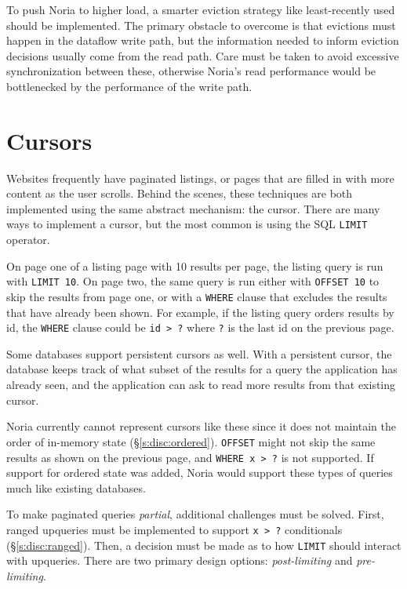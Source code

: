 To push Noria to higher load, a smarter eviction strategy like least-recently
used should be implemented. The primary obstacle to overcome is that evictions
must happen in the dataflow write path, but the information needed to inform
eviction decisions usually come from the read path. Care must be taken to avoid
excessive synchronization between these, otherwise Noria's read performance
would be bottlenecked by the performance of the write path.

\section{Cursors}

Websites frequently have paginated listings, or pages that are filled in with
more content as the user scrolls. Behind the scenes, these techniques are both
implemented using the same abstract mechanism: the cursor. There are many ways to
implement a cursor, but the most common is using the SQL \texttt{LIMIT}
operator.

On page one of a listing page with 10 results per page, the listing query is run
with \texttt{LIMIT 10}. On page two, the same query is run either with
\texttt{OFFSET 10} to skip the results from page one, or with a \texttt{WHERE}
clause that excludes the results that have already been shown. For example, if
the listing query orders results by id, the \texttt{WHERE} clause could be
\texttt{id > ?} where \texttt{?} is the last id on the previous page.

Some databases support persistent cursors as well. With a persistent cursor, the
database keeps track of what subset of the results for a query the application
has already seen, and the application can ask to read more results from that
existing cursor.

Noria currently cannot represent cursors like these since it does not maintain
the order of in-memory state (\S\ref{s:disc:ordered}). \texttt{OFFSET} might not
skip the same results as shown on the previous page, and \texttt{WHERE x > ?} is
not supported. If support for ordered state was added, Noria would support these
types of queries much like existing databases.

To make paginated queries \emph{partial}, additional challenges must be solved.
First, ranged upqueries must be implemented to support \texttt{x > ?}
conditionals (\S\ref{s:disc:ranged}). Then, a decision must be made as to how
\texttt{LIMIT} should interact with upqueries. There are two primary design
options: \emph{post-limiting} and \emph{pre-limiting}.


